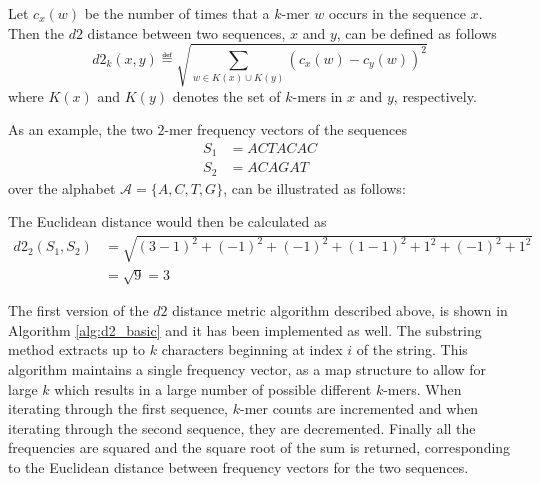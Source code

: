Let $c_x(w)$ be the number of times that a $k$-mer $w$ occurs in the sequence
$x$. Then the $d2$ distance between two sequences, $x$ and $y$, can be defined
as follows~\cite[pp.~1--2]{hazelhurst}
\[
  d2_k(x,y) \eqdef \sqrt{\sum_{w \in K(x) \cup K(y)} (c_x(w) - c_y(w))^2}
\]
where $K(x)$ and $K(y)$ denotes the set of $k$-mers in $x$ and $y$,
respectively.

As an example, the two $2$-mer frequency vectors of the sequences
\begin{align*}
  S_1 &= ACTACAC \\
  S_2 &= ACAGAT
\end{align*}
over the alphabet $\mathcal{A} = \{A,C,T,G\}$, can be illustrated as follows:

\begin{table}[!h]
\centering
{}
\end{table}

The Euclidean distance would then be calculated as
\begin{align*}
  d2_2(S_1, S_2)
    &= \sqrt{(3-1)^2 + (-1)^2 + (-1)^2 + (1-1)^2 + 1^2 + (-1)^2 + 1^2} \\
    &= \sqrt{9} = 3
\end{align*}

The first version of the $d2$ distance metric algorithm described above, is
shown in Algorithm \ref{alg:d2_basic} and it has been implemented as well. The
substring method extracts up to $k$ characters beginning at index $i$ of the
string. This algorithm maintains a single frequency vector, as a map structure
to allow for large $k$ which results in a large number of possible different
$k$-mers. When iterating through the first sequence, $k$-mer counts are
incremented and when iterating through the second sequence, they are
decremented. Finally all the frequencies are squared and the square root of the
sum is returned, corresponding to the Euclidean distance between frequency
vectors for the two sequences.

